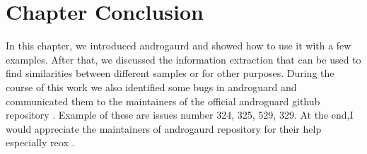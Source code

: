 \documentclass[../main.tex]{subfile}
\begin{document}
		
		\section{Chapter Conclusion} In this chapter, we introduced androgaurd and showed how to use it with a few examples. After that, we discussed the information extraction that can be used to find similarities between different samples or for other purposes. During the course of this work we also identified some bugs in androguard and communicated them to the maintainers of the official androguard github repository \cite{desnos2017androguard}. Example of these are issues number 324, 325, 529, 329. At the end,I would appreciate the maintainers of androgaurd repository for their help especially reox \cite{reox}.
\end{document}
